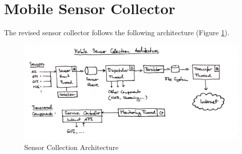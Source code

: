 





\section{Mobile Sensor Collector}

The revised sensor collector follows the following architecture
(Figure \ref{fig:sc_architecture}).

\begin{figure}[htbp]
\centering
\includegraphics[width=\textwidth]{img/sc/sc_architecture.jpg}
\caption{Sensor Collection Architecture}\label{fig:sc_architecture}
\end{figure}

